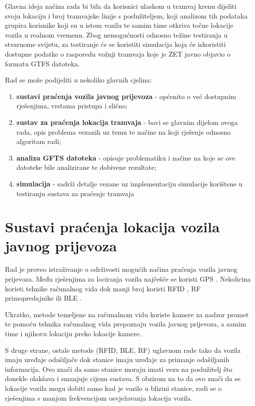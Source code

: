 \documentclass[times, utf8, diplomski]{fer}
\begin{document}
Glavna ideja načina rada bi bila da korisnici ulaskom u tramvaj krenu dijeliti svoju lokaciju i broj tramvajske linije s poslužiteljem, koji analizom tih podataka grupira korisnike koji su u istom vozilu te samim time otkriva točne lokacije vozila u realnom vremenu.
Zbog nemogućnosti odnosno težine testiranja u stvarnome svijetu, za testiranje će se koristiti simulacija koja će iskoristiti dostupne podatke o rasporedu vožnji tramvaja koje je ZET javno objavio o formatu GTFS  datoteka.

Rad se može podijeliti u nekoliko glavnih cjelina:
\begin{enumerate}
    \item \textbf{sustavi praćenja vozila javnog prijevoza} - općenito o već dostupnim rješenjima, vrstama pristupa i slično;
    \item \textbf{sustav za praćenja lokacija tramvaja} - bavi se glavnim dijelom ovoga rada, opis problema vezanih uz temu te načine na koji rješenje odnosno algoritam radi;
    \item \textbf{analiza GFTS datoteka} - opisuje problematiku i načine na koje se ove datoteke bile analizirane te dobivene rezultate;
    \item \textbf{simulacija} - sadrži detalje vezane uz implementaciju simulacije korištene u testiranju sustava za praćenje tramvaja
\end{enumerate}



\chapter{Sustavi praćenja lokacija vozila javnog prijevoza}
Rad \cite{public_transport_tracking_review} je proveo istraživanje o održivosti mogućih načina praćenja vozila javnog prijevoza. 
Među rješenjima za lociranja vozila najčešće se koristi GPS . Nekolicina koristi tehnike računalnog vida  dok manji broj koristi RFID , RF  primopredajnike ili BLE .

Ukratko, metode temeljene na računalnom vidu koriste kamere za nadzor promet te pomoću tehnika računalnog vida prepoznaju vozila javnog prijevoza, a samim time i njihovu lokaciju preko lokacije kamere.

S druge strane, ostale metode (RFID, BLE, RF) uglavnom rade tako da vozila imaju uređaje odašiljače dok stanice imaju uređaje za primanje odašiljanih informacija. Ovo znači da samo stanice moraju imati vezu na poslužitelj što donekle olakšava i smanjuje cijenu sustava. S obzirom na to da ovo znači da se lokacije vozila mogu dobiti samo kad je vozilo u blizini stanice, radi se o rješenjima s manjom frekvencijom osvježavanja lokacija vozila.
\end{document}
